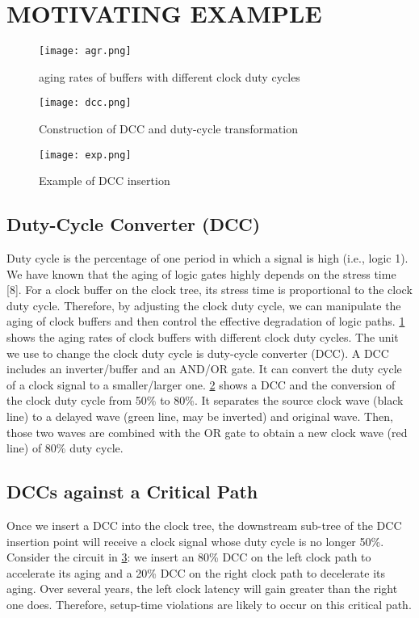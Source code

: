 \section{MOTIVATING EXAMPLE}
\label{sec:mot}
\begin{figure}
	\centering
	\texttt{[image: agr.png]}
	\caption{aging rates of buffers with different clock duty cycles}
	\label{fig:agr}
\end{figure}
\begin{figure}
	\centering
	\texttt{[image: dcc.png]}
	\caption{Construction of DCC and duty-cycle transformation}
	\label{fig:dcc}
\end{figure}
\begin{figure}
	\centering
	\texttt{[image: exp.png]}
	\caption{Example of DCC insertion}
	\label{fig:exp}
\end{figure}

\subsection{Duty-Cycle Converter (DCC)}
Duty cycle is the percentage of one period in which a signal is high (i.e., logic 1). We have known that the aging of logic gates highly depends on the stress time [8]. For a clock buffer on the clock tree, its stress time is proportional to the clock duty cycle. Therefore, by adjusting the clock duty cycle, we can manipulate the aging of clock buffers and then control the effective degradation of logic paths. \ref{fig:agr} shows the aging rates of clock buffers with different clock duty cycles.
The unit we use to change the clock duty cycle is duty-cycle converter (DCC). A DCC includes an inverter/buffer and an AND/OR gate. It can convert the duty cycle of a clock signal to a smaller/larger one. \ref{fig:dcc} shows a DCC and the conversion of the clock duty cycle from 50\% to 80\%. It separates the source clock wave (black line) to a delayed wave (green line, may be inverted) and original wave. Then, those two waves are combined with the OR gate to obtain a new clock wave (red line) of 80\% duty cycle.
\subsection{DCCs against a Critical Path}
Once we insert a DCC into the clock tree, the downstream sub-tree of the DCC insertion point will receive a clock signal whose duty cycle is no longer 50\%. Consider the circuit in \ref{fig:exp}: we insert an 80\% DCC on the left clock path to accelerate its aging and a 20\% DCC on the right clock path to decelerate its aging. Over several years, the left clock latency will gain greater than the right one does. Therefore, setup-time violations are likely to occur on this critical path.